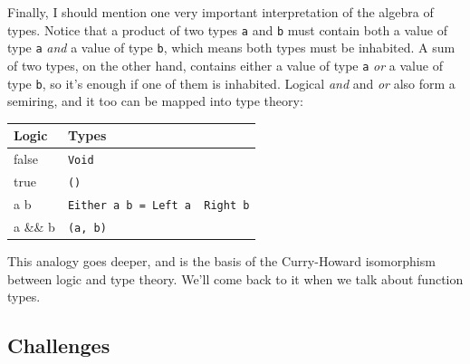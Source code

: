 Finally, I should mention one very important interpretation of the
algebra of types. Notice that a product of two types \texttt{a} and
\texttt{b} must contain both a value of type \texttt{a} \emph{and} a
value of type \texttt{b}, which means both types must be inhabited. A
sum of two types, on the other hand, contains either a value of type
\texttt{a} \emph{or} a value of type \texttt{b}, so it's enough if one
of them is inhabited. Logical \emph{and} and \emph{or} also form a
semiring, and it too can be mapped into type theory:

\begin{longtable}[]{@{}ll@{}}
\toprule
Logic & Types\tabularnewline
\midrule
\endhead
false & \texttt{Void}\tabularnewline
true & \texttt{()}\tabularnewline
a \textbar{}\textbar{} b &
\texttt{Either\ a\ b\ =\ Left\ a\ \textbar{}\ Right\ b}\tabularnewline
a \&\& b & \texttt{(a,\ b)}\tabularnewline
\bottomrule
\end{longtable}

This analogy goes deeper, and is the basis of the Curry-Howard
isomorphism between logic and type theory. We'll come back to it when we
talk about function types.

\subsection{Challenges}\label{challenges}


